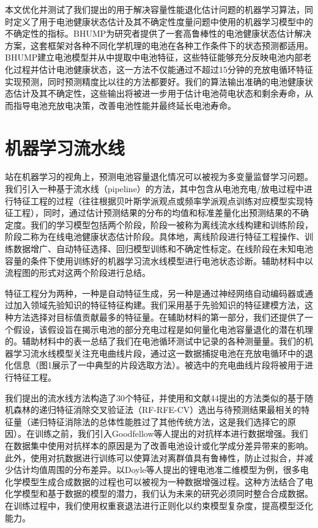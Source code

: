 \documentclass{article}
\begin{document}
本文优化并测试了我们提出的用于解决容量性能退化估计问题的机器学习算法，同时定义了用于电池健康状态估计及其不确定性度量问题中使用的机器学习模型中的不确定性的指标。BHUMP为研究者提供了一套高鲁棒性的电池健康状态估计解决方案，这套框架对各种不同化学机理的电池在各种工作条件下的状态预测都适用。BHUMP建立电池模型并从中提取中电池特征，这些特征能够充分反映电池内部老化过程并估计电池健康状态，这一方法不仅能通过不超过15分钟的充放电循环特征实现预测，同时预测精度比以往的方法都要好。我们的算法输出准确的电池健康状态估计及其不确定性，这些输出将被进一步用于估计电池荷电状态和剩余寿命，从而指导电池充放电决策，改善电池性能并最终延长电池寿命。

\section{机器学习流水线}

站在机器学习的视角上，预测电池容量退化情况可以被视为多变量监督学习问题。我们引入一种基于流水线（pipeline）的方法，其中包含从电池充电/放电过程中进行特征工程的过程（往往根据贝叶斯学派观点或频率学派观点训练对应模型实现特征工程），同时，通过估计预测结果的分布的均值和标准差量化出预测结果的不确定度。我们的学习模型包括两个阶段，阶段一被称为离线流水线构建和训练阶段，阶段二称为在线电池健康状态估计阶段。具体地，离线阶段进行特征工程操作、训练数据增广、自动特征选择、回归模型训练和不确定性标定。在线阶段在未知电池容量的条件下使用训练好的机器学习流水线模型进行电池状态诊断。辅助材料中以流程图的形式对这两个阶段进行总结。

特征工程分为两种，一种是自动特征生成，另一种是通过神经网络自动编码器或通过加入领域先验知识的特征特征构建。我们采用基于先验知识的特征建模方法，这种方法选择对目标值贡献最多的特征量。在辅助材料的第一部分，我们还提供了一个假设，该假设旨在揭示电池的部分充电过程是如何量化电池容量退化的潜在机理的。辅助材料中的表一总结了我们在电池循环测试中记录的各种测量量。我们的机器学习流水线模型关注充电曲线片段，通过这一数据捕捉电池在充放电循环中的退化信息（图1展示了一中典型的片段选取方法）。被选中的充电曲线片段将被用于进行特征工程。

我们提出的流水线方法构造了30个特征，并使用和文献44提出的方法类似的基于随机森林的递归特征消除交叉验证法（RF-RFE-CV）选出与待预测结果最相关的特征量（递归特征消除法的总体性能胜过了其他传统方法，这是我们选择它的原因）。在训练之前，我们引入Goodfellow等人提出的对抗样本进行数据增强。我们在数据集中使用对抗样本的原因是为了改善电池设计或化学成分差异带来的影响。此外，使用对抗数据进行训练可以使算法对离群值具有鲁棒性，防止过拟合，并减少估计均值周围的分布差异。以Doyle等人提出的锂电池准二维模型为例，很多电化学模型生成合成数据的过程也可以被视为一种数据增强过程。这种方法结合了电化学模型和基于数据的模型的潜力，我们认为未来的研究必须同时整合合成数据。在训练过程中，我们使用权重衰退法进行正则化以约束模型复杂度，提高模型泛化能力。
\end{document}
